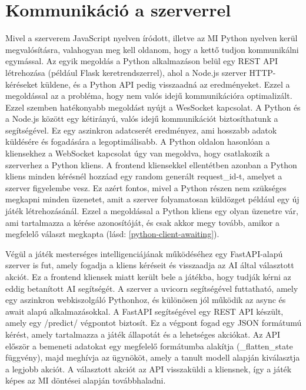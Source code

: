 \documentclass[
]{thesis-ekf}
\theoremstyle{definition}
\theoremstyle{remark}
\begin{document}
	\section{Kommunikáció a szerverrel}
	
	Mivel a szerverem JavaScript nyelven íródott, illetve az MI Python nyelven kerül megvalósításra, valahogyan meg kell oldanom, hogy a kettő tudjon kommunikálni egymással. Az egyik megoldás a Python alkalmazáson belül egy REST API létrehozása (például Flask keretrendszerrel), ahol a Node.js szerver HTTP-kéréseket küldene, és a Python API pedig visszaadná az eredményeket. Ezzel a megoldással az a probléma, hogy nem valós idejű kommunikációra optimalizált. Ezzel szemben hatékonyabb megoldást nyújt a WesSocket kapcsolat. A Python és a Node.js között egy kétirányú, valós idejű kommunikációt biztosíthatunk a segítségével. Ez egy aszinkron adatcserét eredményez, ami hosszabb adatok küldésére és fogadására a legoptimálisabb. A Python oldalon hasonlóan a kliensekhez a WebSocket kapcsolat úgy van megoldva, hogy csatlakozik a szerverhez a Python kliens. A frontend kliensekkel ellentétben azonban a Python kliens minden kérésnél hozzáad egy random generált request\_id-t, amelyet a szerver figyelembe vesz. Ez azért fontos, mivel a Python részen nem szükséges megkapni minden üzenetet, amit a szerver folyamatosan küldözget például egy új játék létrehozásánál. Ezzel a megoldással a Python kliens egy olyan üzenetre vár, ami tartalmazza a kérése azonosítóját, és csak akkor megy tovább, amikor a megfelelő választ megkapta (lásd: \ref{python-client-awaiting}).
	
	
	
	Végül a játék mesterséges intelligenciájának működéséhez egy FastAPI-alapú szerver is fut, amely fogadja a kliens kéréseit és visszaadja az AI által választott akciót. Ez a frontend kliensek miatt került bele a játékba, hogy tudják kérni az eddig betanított AI segítségét. A szerver a uvicorn segítségével futtatható, amely egy aszinkron webkiszolgáló Pythonhoz, és különösen jól működik az async és await alapú alkalmazásokkal. A FastAPI segítségével egy REST API készült, amely egy /predict/ végpontot biztosít. Ez a végpont fogad egy JSON formátumú kérést, amely tartalmazza a játék állapotát és a lehetséges akciókat. Az API először a bemeneti adatokat egy megfelelő formátumba alakítja (\_flatten\_state függvény), majd meghívja az  ügynököt, amely a tanult modell alapján kiválasztja a legjobb akciót. A választott akciót az API visszaküldi a kliensnek, így a játék képes az MI döntései alapján továbbhaladni.
	
\end{document}
